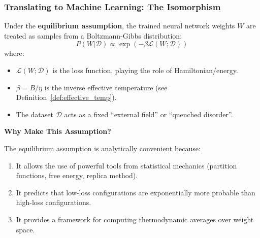 \documentclass[
  journal=largetwo,
  year=2025,
  volume=37,
]{cup-journal}
\begin{document}
\subsubsection{Translating to Machine Learning: The Isomorphism}

\begin{definition}\label{def:ml_equilibrium}
Under the \textbf{equilibrium assumption}, the trained neural network weights $W$ are treated as samples from a Boltzmann-Gibbs distribution:
\begin{equation}\label{eq:ml_gibbs}
    P(W | \mathcal{D}) \propto \exp\left( -\beta \mathcal{L}(W; \mathcal{D}) \right)
\end{equation}
where:
\begin{itemize}
    \item $\mathcal{L}(W; \mathcal{D})$ is the loss function, playing the role of Hamiltonian/energy.
    \item $\beta = B/\eta$ is the inverse effective temperature (see Definition~\ref{def:effective_temp}).
    \item The dataset $\mathcal{D}$ acts as a fixed ``external field'' or ``quenched disorder''.
\end{itemize}
\end{definition}

\textbf{Why Make This Assumption?}

The equilibrium assumption is analytically convenient because:
\begin{enumerate}
    \item It allows the use of powerful tools from statistical mechanics (partition functions, free energy, replica method).
    \item It predicts that low-loss configurations are exponentially more probable than high-loss configurations.
    \item It provides a framework for computing thermodynamic averages over weight space.
\end{enumerate}
\end{document}
